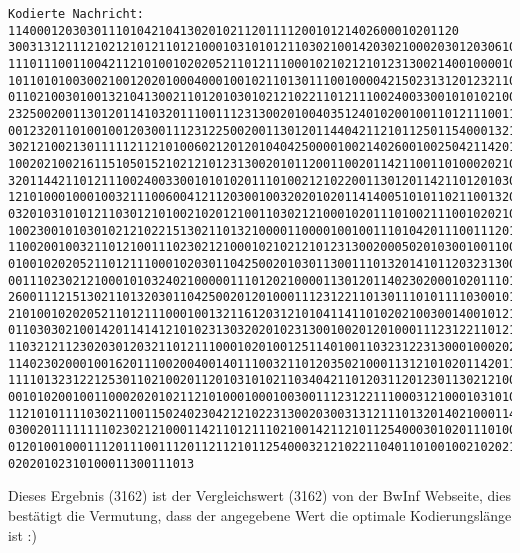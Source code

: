 \documentclass[a4paper,10pt,ngerman]{scrartcl}
\begin{document}
\begin{enumerate}
\begin{verbatim}
Kodierte Nachricht: 114000120303011101042104130201021120111120010121402600010201120
30031312111210212101211012100010310101211030210014203021000203012030610100111012100
11101110011004211210100102020521101211100010210212101231300214001000010101142111020
10110101003002100120201000400010010211013011100100004215023131201232110121000103101
01102100301001321041300211012010301021210221101211100240033001010102100000011121001
23250020011301201141032011100111231300201004035124010200100110121110011120111010021
00123201101001001203001112312250020011301201144042112101125011540001321062010124012
30212100213011111211210100602120120104042500001002140260010025042114201210210203011
10020210021611510501521021210123130020101120011002011421100110100020210021513021101
32011442110121110024003300101010201110100212102200113012011421101201030132104130021
12101000100010032111006004121120300100320201020114140051010110211001320140210101031
03201031010121103012101002102012100110302121000102011101002111001020210000111103202
10023001010301021210221513021101321000011000010010011101042011100111201001210210202
11002001003211012100111023021210001021021210123130020005020103001001100021210221121
01001020205211012111000102030110425002010301130011101320141011203231300010002110121
00111023021210001010324021000001110120210000113012011402302000102011101002111001010
26001112151302110132030110425002012010001112312211013011101011110300101021141000211
21010010202052110121110001001321161203121010411411010202100300140010121121011214101
01103030210014201141412101023130320201023130010020120100011123122110121000103101012
11032121123020301203211012111000102010012511401001103231223130001000202100001130120
11402302000100162011100200400140111003211012035021000113121010201142011112112101120
11110132312212530110210020112010310102110340421101203112012301130212100011420005112
00101020010011000202010211210100010001003001112312211100031210001031010113002313002
11210101111030211001150240230421210223130020300313121110132014021000114404103201012
03002011111111023021210001142110121110210014211210112540003010201110100211102010110
01201001000111201110011120112112101125400032121022110401101001002102021100113021210
02020102310100011300111013
  \end{verbatim}
  Dieses Ergebnis (3162) ist der Vergleichswert (3162) von der BwInf Webseite, dies bestätigt die Vermutung, dass der angegebene Wert die optimale Kodierungslänge ist :)


\end{enumerate}
\end{document}
